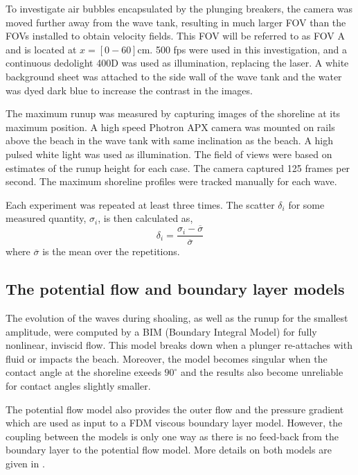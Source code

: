 \documentclass[review]{elsarticle}
\newcommand{\sidenote}[1]{\marginpar{\footnotesize #1}}
\begin{document}
To investigate air bubbles encapsulated by the plunging breakers, the camera was moved further away from the wave tank, resulting in much larger FOV than the FOVs installed to obtain velocity fields. This FOV will be referred to as FOV A and is located at $x=[0-60]$cm.  500 fps were used in this investigation, and a continuous dedolight 400D was used as illumination, replacing the laser. A white background sheet was attached to the side wall of  the wave tank and the water was dyed dark blue to increase the contrast in the images.

The maximum runup was measured by capturing images of the shoreline at its maximum position. A high speed Photron APX  camera was mounted on rails above the beach in the wave tank with same inclination as the beach. A high pulsed white light was used as illumination. The field of views were based on estimates of the runup height for each case. The camera captured 125 frames per second. The maximum shoreline profiles were tracked manually for each wave.


Each experiment was repeated at least three times.
The scatter $\delta_i$ for some measured quantity, $\sigma_i$, is then calculated as,
\begin{equation}
\delta_i=\frac{\sigma_i-\overline{\sigma}}{\overline{\sigma}}
\end{equation}
where $\overline{\sigma}$ is the mean over the  repetitions.

\subsection{The potential flow and boundary layer models}
The evolution of the waves during shoaling, as well as the runup for the smallest amplitude, were 
computed by a BIM (Boundary Integral Model) for fully nonlinear, inviscid flow.
This model breaks down when a plunger re-attaches with fluid or impacts the beach. Moreover, the
model  becomes
singular when the contact angle at the shoreline exeeds $90^\circ$  and the results also become unreliable
for contact angles slightly smaller.  

The potential flow model also provides the outer flow and the pressure gradient
which are used as input to a FDM viscous boundary layer model. However, the coupling between the
models is only one way as  there is no feed-back from the boundary layer to the potential
flow model.   
More details on both models are given in  \cite{pedersen2013runup}.\sidenote{Grid refinement?}   
 
\end{document}

